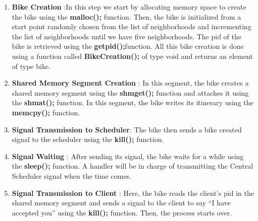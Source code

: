 \begin{enumerate}

    \item \textbf{Bike Creation }:In this step we start by allocating memory space to create the bike using the \textbf{malloc();} function. Then, the bike is initialized from a start point randomly chosen from the list of neighborhoods and incrementing the list of neighborhoods until we have five neighborhoods. The pid of the bike is retrieved using the \textbf{getpid();}function. All this bike creation is done using a function called \textbf{BikeCreation();} of type void and returns an element of type bike.%
   
   \item \textbf{Shared Memory Segment Creation }: In this segment, the bike creates a shared memory segment using the \textbf{shmget();} function and attaches it using the \textbf{shmat();} function. In this segment, the bike writes its itinerary using the \textbf{memcpy();} function.
   
    \item \textbf{Signal Transmission to Scheduler}: The bike then sends a bike created signal to the scheduler using the \textbf{kill();} function. %
    
    \item \textbf{Signal Waiting} : After sending its signal, the bike waits for a while using the \textbf{sleep();} function. A handler will be in charge of transmitting the Central Scheduler signal when the time comes.
  
   \item \textbf{Signal Transmission to Client} : Here, the bike reads the client’s pid in the shared memory segment and sends a signal to the client to say “I have accepted you” using the \textbf{kill();} function. Then, the process starts over.

\end{enumerate}
		


